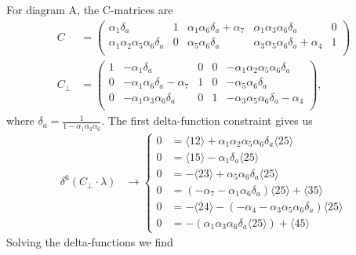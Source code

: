 \documentclass[letter,11pt]{article}
\begin{document}
For diagram A, the C-matrices are
\begin{equation}
	\begin{aligned}
		C
		&=\left(
		\begin{array}{ccccc}
			\alpha _1 \delta_a & 1 & \alpha _1 \alpha _6 \delta_a+\alpha _7 & \alpha _1 \alpha _3 \alpha _6 \delta_a & 0 \\
			\alpha _1 \alpha _2 \alpha _5 \alpha _6 \delta_a & 0 & \alpha _5 \alpha _6 \delta_a & \alpha _3 \alpha _5 \alpha _6 \delta_a+\alpha _4 & 1 \\
		\end{array}
		\right)\\
		C_\perp&=
		\left(
		\begin{array}{ccccc}
			1 & -\alpha _1\delta_a & 0 & 0 & -\alpha _1 \alpha _2 \alpha _5 \alpha _6 \delta_a \\
0 & -\alpha _1 \alpha _6 \delta_a-\alpha _7 & 1 & 0 & -\alpha _5 \alpha _6 \delta_a \\
0 & -\alpha _1 \alpha _3 \alpha _6 \delta_a & 0 & 1 & -\alpha _3 \alpha _5 \alpha _6 \delta_a-\alpha _4 \\
		\end{array}
		\right),
	\end{aligned}
\end{equation}
where $\delta_a=\frac{1}{1-\alpha_1\alpha_2\alpha_6}$. The first delta-function constraint gives us
\begin{equation}
	\begin{aligned}
				\delta^{6}(C_\perp\cdot \lambda)&\rightarrow\begin{cases} 0&=
		\langle 1 2 \rangle + \alpha_{1} \alpha_{2} \alpha_{5} \alpha_{6} \delta_a \langle 2 5 \rangle
		\\0&=
		\langle 1 5 \rangle - \alpha_{1} \delta_a \langle 2 5 \rangle
		\\0&=
		-\langle 2 3 \rangle + \alpha_{5} \alpha_{6} \delta_a \langle 2 5 \rangle
		\\0&=
		(-\alpha_{7} - \alpha_{1} \alpha_{6} \delta_a) \langle 2 5 \rangle + \langle 3 5 \rangle
		\\0&=
		-\langle 2 4 \rangle - (-\alpha_{4} - \alpha_{3} \alpha_{5} \alpha_{6} \delta_a) \langle 2 5 \rangle
		\\0&=
		-(\alpha_{1} \alpha_{3} \alpha_{6} \delta_a \langle 2 5 \rangle) + \langle 4 5 \rangle
				\end{cases}
	\end{aligned}
\end{equation}
Solving the delta-functions we find
\end{document}
